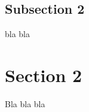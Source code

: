 \documentclass{article}
\begin{document}
\subsection{Subsection 2}
bla bla

\section{Section 2}
Bla bla bla \cite{CountdownTimer}







\end{document}
